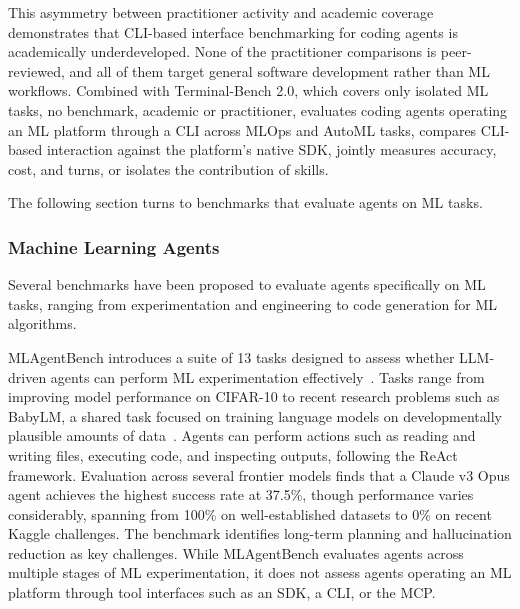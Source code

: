 \documentclass[
english,                 %
bibtex,                  %
]{kththesis}
\numberwithin{listing}{chapter}
\begin{document}
This asymmetry between practitioner activity and academic coverage demonstrates that \gls{CLI}-based interface benchmarking for coding agents is academically underdeveloped. None of the practitioner comparisons is peer-reviewed, and all of them target general software development rather than \gls{ML} workflows. Combined with Terminal-Bench 2.0, which covers only isolated \gls{ML} tasks, no benchmark, academic or practitioner, evaluates coding agents operating an \gls{ML} platform through a \gls{CLI} across \gls{MLOps} and \gls{AutoML} tasks, compares \gls{CLI}-based interaction against the platform's native \gls{SDK}, jointly measures accuracy, cost, and turns, or isolates the contribution of skills.

The following section turns to benchmarks that evaluate agents on \gls{ML} tasks.

\subsubsection{Machine Learning Agents}
\label{sec:bg_machine_learning_agents}

Several benchmarks have been proposed to evaluate agents specifically on \gls{ML} tasks, ranging from experimentation and engineering to code generation for \gls{ML} algorithms.

\gls{ML}AgentBench introduces a suite of 13 tasks designed to assess whether \gls{LLM}-driven agents can perform \gls{ML} experimentation effectively~\cite{huang_mlagentbench_2024}. Tasks range from improving model performance on \gls{CIFAR}-10 to recent research problems such as \gls{BabyLM}, a shared task focused on training language models on developmentally plausible amounts of data~\cite{edman_mask_2025}. Agents can perform actions such as reading and writing files, executing code, and inspecting outputs, following the ReAct framework. Evaluation across several frontier models finds that a Claude v3 Opus agent achieves the highest success rate at 37.5\%, though performance varies considerably, spanning from 100\% on well-established datasets to 0\% on recent Kaggle challenges. The benchmark identifies long-term planning and hallucination reduction as key challenges. While \gls{ML}AgentBench evaluates agents across multiple stages of \gls{ML} experimentation, it does not assess agents operating an \gls{ML} platform through tool interfaces such as an \gls{SDK}, a \gls{CLI}, or the \gls{MCP}.
\end{document}
